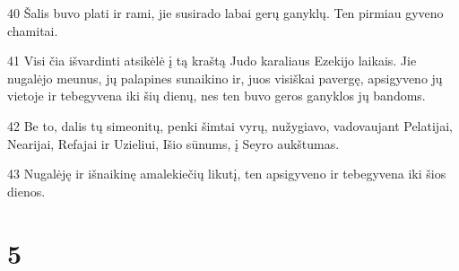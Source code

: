 \par 40 Šalis buvo plati ir rami, jie susirado labai gerų ganyklų. Ten pirmiau gyveno chamitai. 
\par 41 Visi čia išvardinti atsikėlė į tą kraštą Judo karaliaus Ezekijo laikais. Jie nugalėjo meunus, jų palapines sunaikino ir, juos visiškai pavergę, apsigyveno jų vietoje ir tebegyvena iki šių dienų, nes ten buvo geros ganyklos jų bandoms. 
\par 42 Be to, dalis tų simeonitų, penki šimtai vyrų, nužygiavo, vadovaujant Pelatijai, Nearijai, Refajai ir Uzieliui, Išio sūnums, į Seyro aukštumas. 
\par 43 Nugalėję ir išnaikinę amalekiečių likutį, ten apsigyveno ir tebegyvena iki šios dienos.



\chapter{5}


